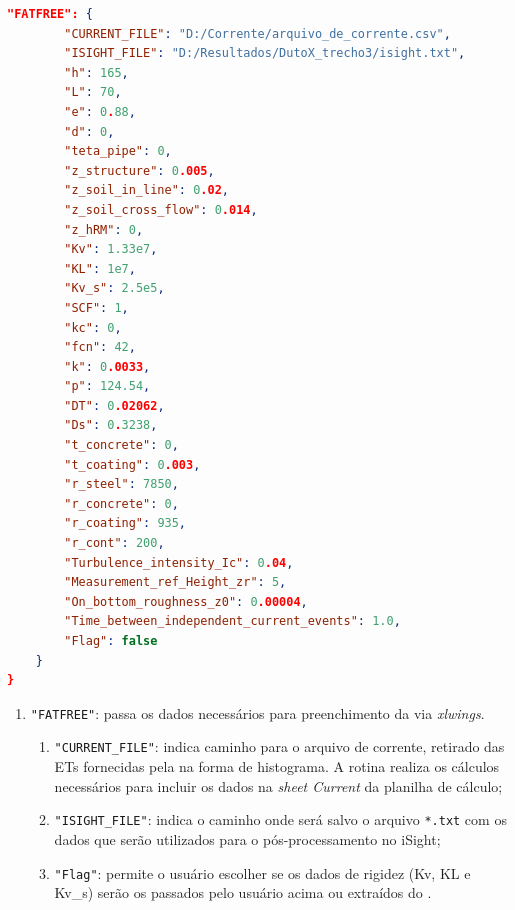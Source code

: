 \begin{lstlisting}[firstnumber=207, language=json, label={tab:jdsn-arquivojson7}, caption={Exemplo de arquivo de entrada de dados - Parte 7/7}]
    "FATFREE": {
        "CURRENT_FILE": "D:/Corrente/arquivo_de_corrente.csv",
        "ISIGHT_FILE": "D:/Resultados/DutoX_trecho3/isight.txt",
        "h": 165,
        "L": 70,
        "e": 0.88,
        "d": 0,
        "teta_pipe": 0,
        "z_structure": 0.005,
        "z_soil_in_line": 0.02,
        "z_soil_cross_flow": 0.014,
        "z_hRM": 0,
        "Kv": 1.33e7,
        "KL": 1e7,
        "Kv_s": 2.5e5,
        "SCF": 1,
        "kc": 0,
        "fcn": 42,
        "k": 0.0033,
        "p": 124.54,
        "DT": 0.02062,
        "Ds": 0.3238,
        "t_concrete": 0,
        "t_coating": 0.003,
        "r_steel": 7850,
        "r_concrete": 0,
        "r_coating": 935,
        "r_cont": 200,
        "Turbulence_intensity_Ic": 0.04,
        "Measurement_ref_Height_zr": 5,
        "On_bottom_roughness_z0": 0.00004,
        "Time_between_independent_current_events": 1.0,
        "Flag": false
    }
}
\end{lstlisting}

\begin{enumerate}
    \item \texttt{"FATFREE"}: passa os dados necessários para preenchimento da \fatfree via \textit{xlwings}.
    \begin{enumerate}
        \item \texttt{"CURRENT\_FILE"}: indica caminho para o arquivo de corrente, retirado das ETs fornecidas pela na forma de histograma. A rotina realiza os cálculos necessários para incluir os dados na \textit{sheet Current} da planilha de cálculo;
        \item \texttt{"ISIGHT\_FILE"}: indica o caminho onde será salvo o arquivo \texttt{*.txt} com os dados que serão utilizados para o pós-processamento no iSight;
        \item \texttt{"Flag"}: permite o usuário escolher se os dados de rigidez (Kv, KL e  Kv\_s) serão os passados pelo usuário acima ou extraídos do \abaqus.
    \end{enumerate}
\end{enumerate}
